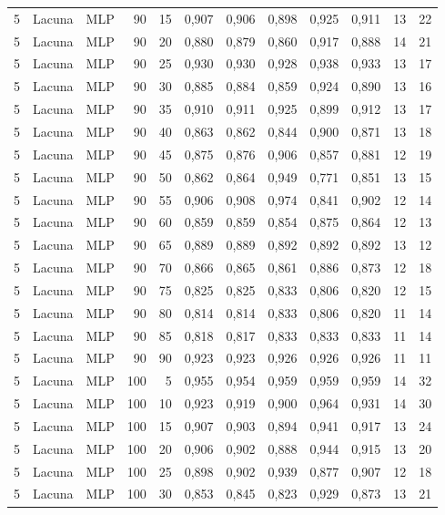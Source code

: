 \begin{longtable}{@{}rllrrrrrrrrr@{}}
5 & Lacuna & MLP & 90 & 15 & 0,907 & 0,906 & 0,898 & 0,925 & 0,911 & 13 & 22 \\
5 & Lacuna & MLP & 90 & 20 & 0,880 & 0,879 & 0,860 & 0,917 & 0,888 & 14 & 21 \\
5 & Lacuna & MLP & 90 & 25 & 0,930 & 0,930 & 0,928 & 0,938 & 0,933 & 13 & 17 \\
5 & Lacuna & MLP & 90 & 30 & 0,885 & 0,884 & 0,859 & 0,924 & 0,890 & 13 & 16 \\
5 & Lacuna & MLP & 90 & 35 & 0,910 & 0,911 & 0,925 & 0,899 & 0,912 & 13 & 17 \\
5 & Lacuna & MLP & 90 & 40 & 0,863 & 0,862 & 0,844 & 0,900 & 0,871 & 13 & 18 \\
5 & Lacuna & MLP & 90 & 45 & 0,875 & 0,876 & 0,906 & 0,857 & 0,881 & 12 & 19 \\
5 & Lacuna & MLP & 90 & 50 & 0,862 & 0,864 & 0,949 & 0,771 & 0,851 & 13 & 15 \\
5 & Lacuna & MLP & 90 & 55 & 0,906 & 0,908 & 0,974 & 0,841 & 0,902 & 12 & 14 \\
5 & Lacuna & MLP & 90 & 60 & 0,859 & 0,859 & 0,854 & 0,875 & 0,864 & 12 & 13 \\
5 & Lacuna & MLP & 90 & 65 & 0,889 & 0,889 & 0,892 & 0,892 & 0,892 & 13 & 12 \\
5 & Lacuna & MLP & 90 & 70 & 0,866 & 0,865 & 0,861 & 0,886 & 0,873 & 12 & 18 \\
5 & Lacuna & MLP & 90 & 75 & 0,825 & 0,825 & 0,833 & 0,806 & 0,820 & 12 & 15 \\
5 & Lacuna & MLP & 90 & 80 & 0,814 & 0,814 & 0,833 & 0,806 & 0,820 & 11 & 14 \\
5 & Lacuna & MLP & 90 & 85 & 0,818 & 0,817 & 0,833 & 0,833 & 0,833 & 11 & 14 \\
5 & Lacuna & MLP & 90 & 90 & 0,923 & 0,923 & 0,926 & 0,926 & 0,926 & 11 & 11 \\
5 & Lacuna & MLP & 100 & 5 & 0,955 & 0,954 & 0,959 & 0,959 & 0,959 & 14 & 32 \\
5 & Lacuna & MLP & 100 & 10 & 0,923 & 0,919 & 0,900 & 0,964 & 0,931 & 14 & 30 \\
5 & Lacuna & MLP & 100 & 15 & 0,907 & 0,903 & 0,894 & 0,941 & 0,917 & 13 & 24 \\
5 & Lacuna & MLP & 100 & 20 & 0,906 & 0,902 & 0,888 & 0,944 & 0,915 & 13 & 20 \\
5 & Lacuna & MLP & 100 & 25 & 0,898 & 0,902 & 0,939 & 0,877 & 0,907 & 12 & 18 \\
5 & Lacuna & MLP & 100 & 30 & 0,853 & 0,845 & 0,823 & 0,929 & 0,873 & 13 & 21 \\

\end{longtable}
